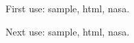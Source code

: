 \documentclass[14pt]{extarticle}
\begin{document}
 First use: \gls{sample}, \gls{html}, \gls{nasa}. 

Next use: \gls{sample}, \gls{html}, \gls{nasa}. 

\printunsrtglossaries 
\end{document}
